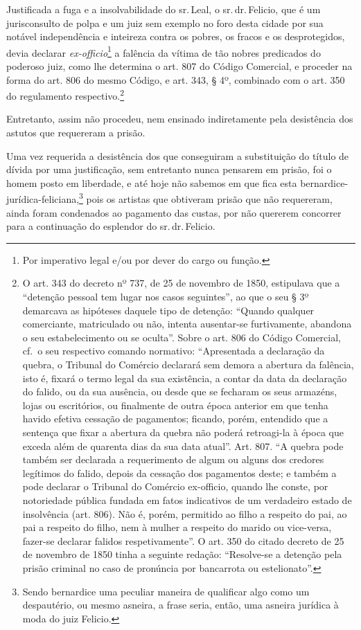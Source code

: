 Justificada a fuga e a insolvabilidade do sr.\,Leal, o sr.\,dr.\,Felicio,
que é um jurisconsulto de polpa e um juiz sem exemplo no foro desta
cidade por sua notável independência e inteireza contra os pobres, os
fracos e os desprotegidos, devia declarar \emph{ex-officio}\footnote{
  Por imperativo legal e/ou por dever do cargo ou função.} a falência da
vítima de tão nobres predicados do poderoso juiz, como lhe determina o
art. 807 do Código Comercial, e proceder na forma do art. 806 do mesmo
Código, e art. 343, § 4º, combinado com o art. 350 do regulamento
respectivo.\footnote{ O art. 343 do decreto nº 737, de 25 de novembro de 1850,
  estipulava que a ``detenção pessoal tem lugar nos casos seguintes'', ao
  que o seu § 3º demarcava as hipóteses daquele tipo de detenção:
  ``Quando qualquer comerciante, matriculado ou não, intenta ausentar-se
  furtivamente, abandona o seu estabelecimento ou se oculta''. Sobre o
  art. 806 do Código Comercial, cf.~o seu respectivo comando normativo:
  ``Apresentada a declaração da quebra, o Tribunal do Comércio declarará
  sem demora a abertura da falência, isto é, fixará o termo legal da sua
  existência, a contar da data da declaração do falido, ou da sua
  ausência, ou desde que se fecharam os seus armazéns, lojas ou
  escritórios, ou finalmente de outra época anterior em que tenha havido
  efetiva cessação de pagamentos; ficando, porém, entendido que a
  sentença que fixar a abertura da quebra não poderá retroagi-la à época
  que exceda além de quarenta dias da sua data atual''. Art. 807. ``A
  quebra pode também ser declarada a requerimento de algum ou alguns dos
  credores legítimos do falido, depois da cessação dos pagamentos deste;
  e também a pode declarar o Tribunal do Comércio ex-officio, quando lhe
  conste, por notoriedade pública fundada em fatos indicativos de um
  verdadeiro estado de insolvência (art. 806). Não é, porém, permitido
  ao filho a respeito do pai, ao pai a respeito do filho, nem à mulher a
  respeito do marido ou vice-versa, fazer-se declarar falidos
  respetivamente''. O art. 350 do citado decreto de 25 de novembro de 1850 tinha a
  seguinte redação: ``Resolve-se a detenção pela prisão criminal no caso
  de pronúncia por bancarrota ou estelionato''.}

Entretanto, assim não procedeu, nem ensinado indiretamente pela
desistência dos astutos que requereram a prisão.

Uma vez requerida a desistência dos que conseguiram a substituição do
título de dívida por uma justificação, sem entretanto nunca pensarem em
prisão, foi o homem posto em liberdade, e até hoje não sabemos em que
fica esta bernardice-jurídica-feliciana,\footnote{ Sendo bernardice uma
  peculiar maneira de qualificar algo como um despautério, ou mesmo
  asneira, a frase seria, então, uma asneira jurídica à moda do juiz
  Felicio.} pois os artistas que obtiveram prisão que não requereram,
ainda foram condenados ao pagamento das custas, por não quererem
concorrer para a continuação do esplendor do sr.\,dr.\,Felicio.

